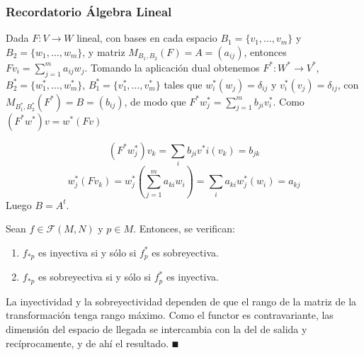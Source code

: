 \documentclass[Cursovd_portada.tex]{subfiles}
\begin{document}
\subsubsection{Recordatorio Álgebra Lineal}

Dada $F:V\to W$ lineal, con bases en cada espacio $B_1=\{v_1,\dots,v_m\}$ y $B_2=\{w_1,\dots,w_m\}$, y matriz $M_{B_1,B_2}(F)=A=(a_{ij})$, entonces $Fv_i=\sum_{j=1}^m a_{ij}w_j$. Tomando la aplicación dual obtenemos $F^*:W^*\to V^*$, $B_2^*=\{w^*_1,\dots,w^*_m\}$, $B_1^*=\{v^*_1,\dots,v^*_m\}$ tales que $w^*_i(w_j)=\delta_{ij}$ y $v^*_i(v_j)=\delta_{ij}$, con $M_{B^*_1,B^*_2}(F^*)=B=(b_{ij})$, de modo que $F^*w^*_j=\sum_{j=1}^m b_{ji}v_i^*$. Como $(F^*w^*)v=w^*(Fv)$

$$(F^*w^*_j)v_k=\sum_i b_{ji}v^*i(v_k)=b_{jk}$$
$$w^*_j(Fv_k)=w^*_j(\sum_{j=1}^ma_{ki}w_i)=\sum_i a_{ki}w^*_j(w_i)=a_{kj}$$
Luego $B=A^t$. 

\begin{prop}
Sean $f\in\mathcal{F}(M,N)$ y $p\in M$. Entonces, se verifican:
\begin{enumerate}
\item $f_{*p}$ es inyectiva si y sólo si $f_p^*$ es sobreyectiva.
\item $f_{*p}$ es sobreyectiva si y sólo si $f_p^*$ es inyectiva.
\end{enumerate}
\end{prop}

\begin{dem}
La inyectividad y la sobreyectividad dependen de que el rango de la matriz de la transformación tenga rango máximo. Como el functor es contravariante, las dimensión del espacio de llegada se intercambia con la del de salida y recíprocamente, y de ahí el resultado. $\QED$
\end{dem}
\newpage
\end{document}

